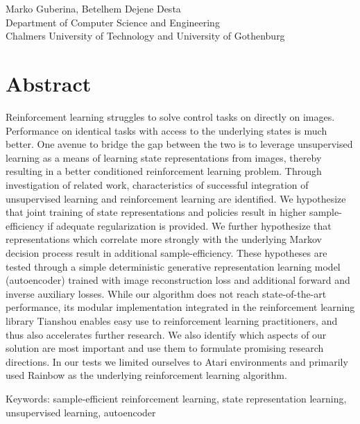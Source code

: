 \oneLineTitle\\
\oneLineSubtitle\\
Marko Guberina,
Betelhem Dejene Desta\\
Department of Computer Science and Engineering\\
Chalmers University of Technology and University of Gothenburg\setlength{\parskip}{0.5cm}

\thispagestyle{plain}			%
\setlength{\parskip}{0pt plus 1.0pt}
\section*{Abstract}
Reinforcement learning struggles to solve control tasks on directly on images.
Performance on identical tasks with access to the underlying states is much better.
One avenue to bridge the gap between the two is to leverage unsupervised learning
as a means of learning state representations from images, thereby resulting
in a better conditioned reinforcement learning problem.
Through investigation of related work, characteristics of successful 
integration of unsupervised learning and reinforcement learning are identified.
We hypothesize that joint training of state representations and policies
result in higher sample-efficiency if adequate regularization is provided.
We further hypothesize that representations which correlate more strongly
with the underlying Markov decision process result in additional sample-efficiency.
These hypotheses are tested through a simple deterministic generative 
representation learning model (autoencoder) trained with image reconstruction loss
and additional forward and inverse auxiliary losses.
While our algorithm does not reach state-of-the-art performance,
its modular implementation integrated in the reinforcement learning library Tianshou
enables easy use to reinforcement learning practitioners,
and thus also accelerates further research.
We also identify which aspects of our solution are most important 
and use them to formulate promising research directions.
In our tests we limited ourselves to Atari environments
and primarily used Rainbow as the underlying reinforcement learning algorithm.

\vfill
Keywords: sample-efficient reinforcement learning, state representation learning, unsupervised learning,
autoencoder


\newpage				%
\thispagestyle{empty}
\mbox{}
